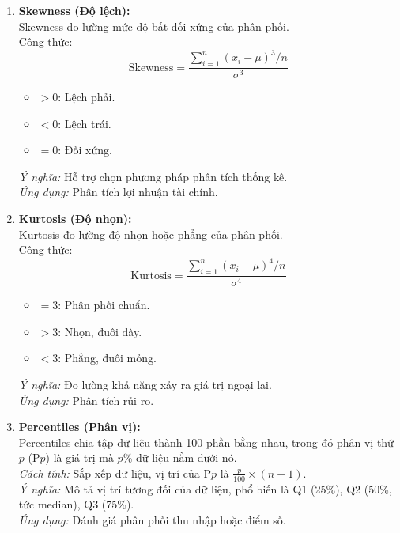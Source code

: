 \documentclass[a4paper,12pt]{article}
\begin{document}
\begin{enumerate}[label=\Roman*.]
    \item \textbf{Skewness (Độ lệch):} \\
    Skewness đo lường mức độ bất đối xứng của phân phối. \\
    Công thức:
    \[
    \text{Skewness} = \frac{\sum_{i=1}^{n} (x_i - \mu)^3 / n}{\sigma^3}
    \]
    \begin{itemize}
        \item \(> 0\): Lệch phải.
        \item \(< 0\): Lệch trái.
        \item \(= 0\): Đối xứng.
    \end{itemize}
    \textit{Ý nghĩa:} Hỗ trợ chọn phương pháp phân tích thống kê. \\
    \textit{Ứng dụng:} Phân tích lợi nhuận tài chính.

    \item \textbf{Kurtosis (Độ nhọn):} \\
    Kurtosis đo lường độ nhọn hoặc phẳng của phân phối. \\
    Công thức:
    \[
    \text{Kurtosis} = \frac{\sum_{i=1}^{n} (x_i - \mu)^4 / n}{\sigma^4}
    \]
    \begin{itemize}
        \item \(= 3\): Phân phối chuẩn.
        \item \(> 3\): Nhọn, đuôi dày.
        \item \(< 3\): Phẳng, đuôi mỏng.
    \end{itemize}
    \textit{Ý nghĩa:} Đo lường khả năng xảy ra giá trị ngoại lai. \\
    \textit{Ứng dụng:} Phân tích rủi ro.

    \item \textbf{Percentiles (Phân vị):} \\
    Percentiles chia tập dữ liệu thành 100 phần bằng nhau, trong đó phân vị thứ \(p\) (P\(p\)) là giá trị mà \(p\%\) dữ liệu nằm dưới nó. \\
    \textit{Cách tính:} Sắp xếp dữ liệu, vị trí của P\(p\) là \( \frac{p}{100} \times (n+1) \). \\
    \textit{Ý nghĩa:} Mô tả vị trí tương đối của dữ liệu, phổ biến là Q1 (25\%), Q2 (50\%, tức median), Q3 (75\%). \\
    \textit{Ứng dụng:} Đánh giá phân phối thu nhập hoặc điểm số.
\end{enumerate}
\end{document}
